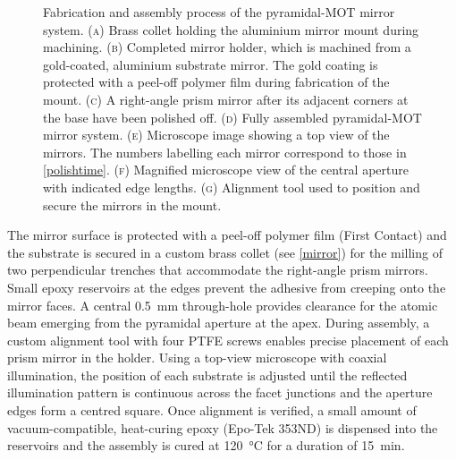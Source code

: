 \documentclass[../Thesis-IJspeert.tex]{subfiles}
\begin{document}
\begin{figure}[!t]
	\caption[Fabrication and assembly process of the pyramidal-MOT mirror system]{Fabrication and assembly process of the pyramidal-MOT mirror system. \textsc{(a)} Brass collet holding the aluminium mirror mount during machining. \textsc{(b)} Completed mirror holder, which is machined from a gold-coated, aluminium substrate mirror. The gold coating is protected with a peel-off polymer film during fabrication of the mount. \textsc{(c)} A right-angle prism mirror after its adjacent corners at the base have been polished off. \textsc{(d)} Fully assembled pyramidal-MOT mirror system. \textsc{(e)} Microscope image showing a top view of the mirrors. The numbers labelling each mirror correspond to those in \autoref{polishtime}. \textsc{(f)} Magnified microscope view of the central aperture with indicated edge lengths. \textsc{(g)} Alignment tool used to position and secure the mirrors in the mount.}
	\label{mirror}
\end{figure}
The mirror surface is protected with a peel-off polymer film (First Contact) and the substrate is secured in a custom brass collet (see \autoref{mirror}) for the milling of two perpendicular trenches that accommodate the right-angle prism mirrors. Small epoxy reservoirs at the edges prevent the adhesive from creeping onto the mirror faces. A central \SI{0.5}{\milli\metre} through-hole provides clearance for the atomic beam emerging from the pyramidal aperture at the apex. During assembly, a custom alignment tool with four PTFE screws enables precise placement of each prism mirror in the holder. Using a top-view microscope with coaxial illumination, the position of each substrate is adjusted until the reflected illumination pattern is continuous across the facet junctions and the aperture edges form a centred square. Once alignment is verified, a small amount of vacuum-compatible, heat-curing epoxy (Epo-Tek 353ND) is dispensed into the reservoirs and the assembly is cured at \SI{120}{\degreeCelsius} for a duration of \SI{15}{\minute}.
\end{document}
